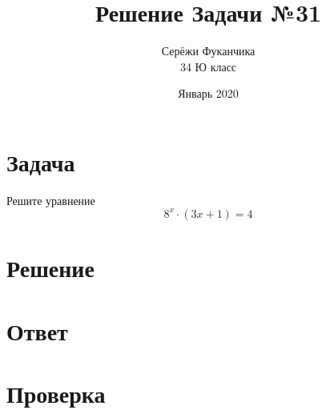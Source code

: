 \documentclass{article}
\title{Решение Задачи №31}
\author{Серёжи Фуканчика\\34 Ю класс}
\date{Январь 2020}
\begin{document}
\maketitle

\section{Задача}
Решите уравнение
$$8^x\cdot{}(3x+1)=4$$

\section{Решение}

\section{Ответ}

\section{Проверка}
\end{document}
